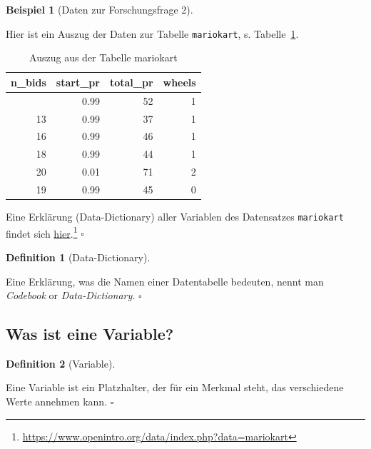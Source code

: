 \documentclass[
  letterpaper,
]{scrbook}
\theoremstyle{definition}
\theoremstyle{definition}
\newtheorem{example}{Beispiel}[chapter]
\theoremstyle{definition}
\newtheorem{definition}{Definition}[chapter]
\theoremstyle{remark}
\begin{document}
\begin{example}[Daten zur Forschungsfrage
2]\protect\hypertarget{exm-daten}{}\label{exm-daten}

Hier ist ein Auszug der Daten zur Tabelle \texttt{mariokart}, s.
Tabelle~\ref{tbl-mariokart}.

\begin{longtable}[]{@{}rrrr@{}}

\caption{\label{tbl-mariokart}Auszug aus der Tabelle mariokart}

\tabularnewline

\toprule\noalign{}
n\_bids & start\_pr & total\_pr & wheels \\
\midrule\noalign{}
\endhead
\bottomrule\noalign{}
\endlastfoot
20 & 0.99 & 52 & 1 \\
13 & 0.99 & 37 & 1 \\
16 & 0.99 & 46 & 1 \\
18 & 0.99 & 44 & 1 \\
20 & 0.01 & 71 & 2 \\
19 & 0.99 & 45 & 0 \\

\end{longtable}

Eine Erklärung (Data-Dictionary) aller Variablen des Datensatzes
\texttt{mariokart} findet sich
\href{https://www.openintro.org/data/index.php?data=mariokart}{hier}.\footnote{\url{https://www.openintro.org/data/index.php?data=mariokart}}
\(\square\)

\end{example}

\begin{definition}[Data-Dictionary]\protect\hypertarget{def-datadict}{}\label{def-datadict}

Eine Erklärung, was die Namen einer Datentabelle bedeuten, nennt man
\emph{Codebook} or \emph{Data-Dictionary}. \(\square\)

\end{definition}

\subsection{Was ist eine Variable?}\label{was-ist-eine-variable}

\begin{definition}[Variable]\protect\hypertarget{def-var}{}\label{def-var}

Eine Variable ist ein Platzhalter, der für ein Merkmal steht, das
verschiedene Werte annehmen kann. \(\square\)

\end{definition}
\end{document}
